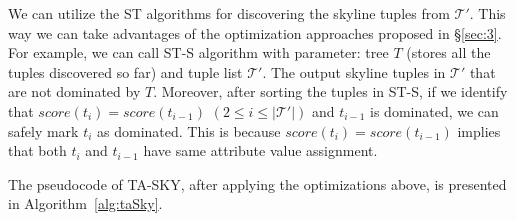 
\vspace{1mm}
 We can utilize the ST algorithms for discovering the skyline tuples from $\mathcal{T'}$. This way we can take advantages of the optimization approaches proposed in \S\ref{sec:3}. For example, we can call ST-S algorithm with parameter: tree $T$ (stores all the tuples discovered so far) and tuple list $\mathcal{T'}$. The output skyline tuples in  $\mathcal{T'}$ that are not dominated by $T$. Moreover, after sorting the tuples in ST-S, if we identify that $score(t_i) = score(t_{i-1})$ $(2 \leq i \leq |\mathcal{T'}|)$ and $t_{i-1}$ is dominated, we can safely mark $t_i$ as dominated. This is because $score(t_i) = score(t_{i-1})$ implies that both $t_i$ and $t_{i-1}$ have same attribute value assignment. 


The pseudocode of TA-SKY, after applying the optimizations above, is presented in Algorithm~\ref{alg:taSky}. 

